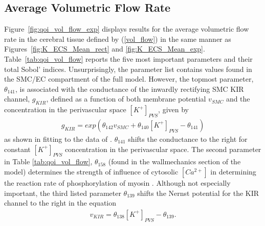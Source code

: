 \subsection{Average Volumetric Flow Rate}
Figure~\ref{fig:qoi_vol_flow_exp} displays results for the average volumetric flow rate in the cerebral tissue defined by (\ref{vol_flow}) in the same manner as Figures~\ref{fig:K_ECS_Mean_rect} and \ref{fig:K_ECS_Mean_exp}.   Table~\ref{tab:qoi_vol_flow} reports the five most important parameters and their total Sobol' indices. Unsurprisingly, the parameter list contains values found in the SMC/EC compartment of the full model. However, the topmost parameter, $\theta_{141}$, is associated with the conductance of the inwardly rectifying SMC KIR channel, $g_{KIR}$, defined as a function of both membrane potential $v_{SMC}$ and the \pot concentration in the perivascular space $[K^+]_{PVS}$, given by 
\begin{eqnarray}
g_{KIR}=exp\left( \theta_{142} v_{SMC}+\theta_{140}[K^+]_{PVS}-\theta_{141}\right)  \label{eqn:gkir}
\end{eqnarray}
as shown in \cite{Dormanns2015} fitting to the data of \cite{Filosa2006}. $\theta_{141}$ shifts the conductance to the right for constant $[K^+]_{PVS}$  concentration in the perivascular space. The second parameter in Table \ref{tab:qoi_vol_flow}, $\theta_{158}$ (found in the wallmechanics section of the model) determines the strength of influence of cytosolic $[Ca^{2+}]$ in determining the reaction rate of phosphorylation of myosin \cite{Hai1988}. Although not especially important, the third listed parameter $\theta_{139}$ shifts the Nernst potential for the KIR channel to the right in the equation
\begin{eqnarray}
v_{KIR}=\theta_{138} [K^+]_{PVS}-\theta_{139}. \label{vkir}
\end{eqnarray}


